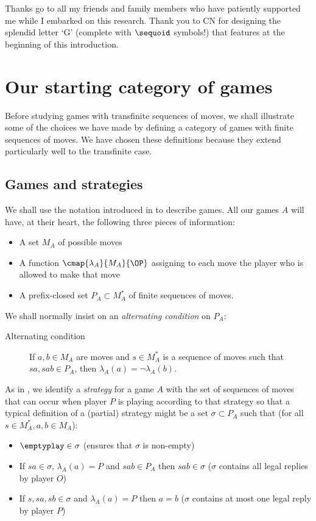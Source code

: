 \documentclass[11pt]{article} %
\begin{document}
Thanks go to all my friends and family members who have patiently supported me while I embarked on this research.  Thank you to CN for designing the splendid letter `G' (complete with $\sequoid$ symbols!) that features at the beginning of this introduction.  

\section{Our starting category of games}

Before studying games with transfinite sequences of moves, we shall illustrate some of the choices we have made by defining a category of games with finite sequences of moves.  We have chosen these definitions because they extend particularly well to the transfinite case.  

\subsection{Games and strategies}

We shall use the notation introduced in \cite{abramskyjagadeesangames} to describe games.  All our games $A$ will have, at their heart, the following three pieces of information:
\begin{itemize}
  \item A set $M_A$ of possible moves
  \item A function $\cmap{\lambda_A}{M_A}{\OP}$ assigning to each move the player who is allowed to make that move
  \item A prefix-closed set $P_A\subset M_A^*$ of finite sequences of moves.
\end{itemize}
We shall normally insist on an \emph{alternating condition} on $P_A$:
\begin{description}
  \item[Alternating condition] If $a,b\in M_A$ are moves and $s\in M_A^*$ is a sequence of moves such that $sa, sab\in P_A$, then $\lambda_A(a)=\neg\lambda_A(b)$.
\end{description}

As in \cite{abramskyjagadeesangames}, we identify a \emph{strategy} for a game $A$ with the set of sequences of moves that can occur when player $P$ is playing according to that strategy so that a typical definition of a (partial) strategy might be a set $\sigma\subset P_A$ such that (for all $s\in M_A^*, a,b\in M_A$):
\begin{itemize}
  \item $\emptyplay\in\sigma$ (ensures that $\sigma$ is non-empty)
  \item If $sa\in\sigma$, $\lambda_A(a)=P$ and $sab\in P_A$ then $sab\in\sigma$ ($\sigma$ contains all legal replies by player $O$)
  \item If $s,sa,sb\in\sigma$ and $\lambda_A(a)=P$ then $a=b$ ($\sigma$ contains at most one legal reply by player $P$)
\end{itemize}
\end{document}
